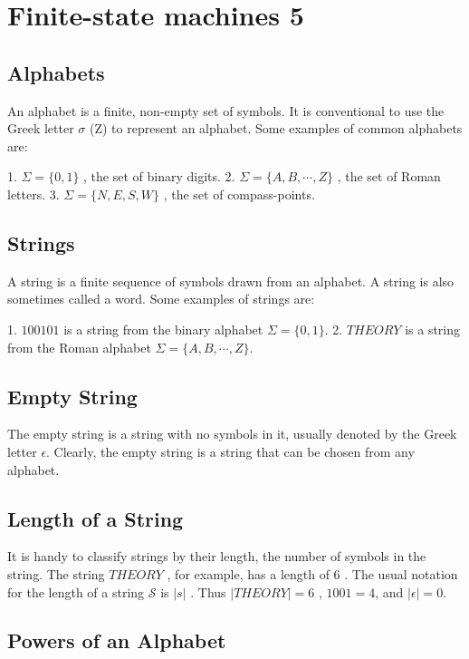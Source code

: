 \documentclass{article}
\begin{document}
\section*{Finite-state machines 5}

\subsection*{Alphabets}

An alphabet is a finite, non-empty set of symbols. It is conventional to use the Greek letter $\sigma$ (Z) to represent an alphabet. Some examples of common alphabets are:

1. $\Sigma = \{0, 1 \}$ , the set of binary digits.
2. $\Sigma = \{A, B, \cdots, Z \}$ , the set of Roman letters.
3. $\Sigma = \{N, E, S, W \}$ , the set of compass-points.

\subsection*{Strings}

A string is a finite sequence of symbols drawn from an alphabet. A string is also sometimes called a word. Some examples of strings are:

1. $100101$ is a string from the binary alphabet $\Sigma = \{0, 1 \}$.
2. $THEORY$ is a string from the Roman alphabet $\Sigma = \{A, B, \cdots, Z \}$.

\subsection*{Empty String}

The empty string is a string with no symbols in it, usually denoted by the Greek letter $\epsilon$. Clearly, the empty string is a string that can be chosen from any alphabet.

\subsection*{Length of a String}

It is handy to classify strings by their length, the number of symbols in the string. The string $THEORY$ , for example, has a length of 6 . The usual notation for the length of a string $\mathcal{S}$ is $| s |$ . Thus $| T H E O R Y |=6$ , $1001 =4$, and $|\epsilon|=0$.

\subsection*{Powers of an Alphabet}
\end{document}

